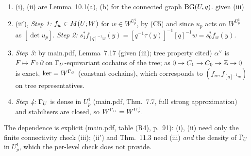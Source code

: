 \begin{outline}
\begin{enumerate}[label=(\arabic*)]
\item (i), (ii) are Lemma~10.1(a), (b) for the connected graph $\mathrm{BG}(U,q)$. \stproved{} given (iii)
\item (ii$'$), \emph{Step 1:} $f_w\in M(U;W)$ for $w\in W^{U^1_p}$, by (C5) and since $u_p$ acts on $W^{U^1_p}$ as $[\det u_p]$. \emph{Step 2:}
  $s_1^*f_{[q]^{-1}w}(y)=[q^{-1}\tau(y)]^{-1}[q]^{-1}w=s_0^*f_w(y)$. \stproved
\item \emph{Step 3:} by main.pdf, Lemma~7.17 (given (iii); tree property cited) $\alpha^\vee$ is $F\mapsto F\circ\partial$ on $\Gamma_U$-equivariant cochains of the tree;
  as $0\to C_1\to C_0\to\mathbb{Z}\to0$ is exact, $\ker=W^{\Gamma_U}$ (constant cochains), which corresponds to $(f_w,f_{[q]^{-1}w})$ on tree representatives. \stpmc
\item \emph{Step 4:} $\Gamma_U$ is dense in $U^1_p$ (main.pdf, Thm.~7.7, full strong approximation) and stabilisers are closed, so $W^{\Gamma_U}=W^{U^1_p}$. \stpmc
\end{enumerate}
The dependence is explicit (main.pdf, table (R4), p.~91): (i), (ii) need only the finite connectivity check (iii); (ii$'$) and Thm.~11.3 need (iii) \emph{and} the density
of $\Gamma_U$ in $U^1_p$, which the per-level check does not provide.
\end{outline}

